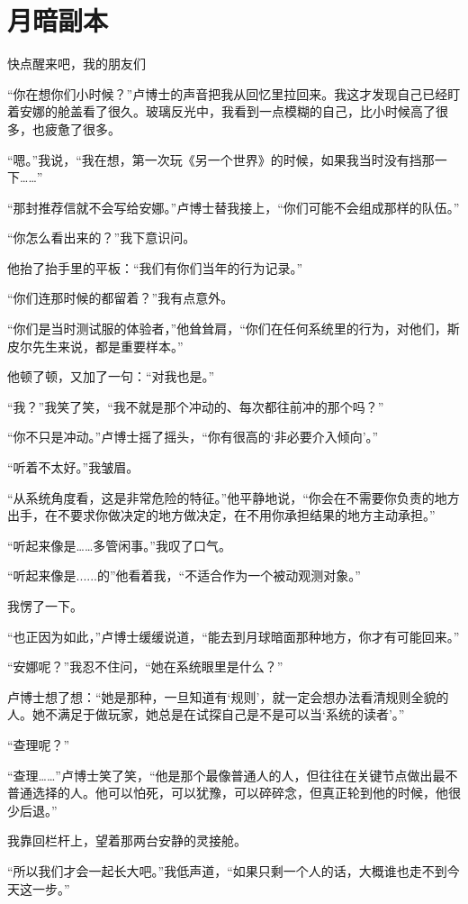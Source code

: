 \chapter{月暗副本}

快点醒来吧，我的朋友们

“你在想你们小时候？”卢博士的声音把我从回忆里拉回来。我这才发现自己已经盯着安娜的舱盖看了很久。玻璃反光中，我看到一点模糊的自己，比小时候高了很多，也疲惫了很多。

“嗯。”我说，“我在想，第一次玩《另一个世界》的时候，如果我当时没有挡那一下……”

“那封推荐信就不会写给安娜。”卢博士替我接上，“你们可能不会组成那样的队伍。”

“你怎么看出来的？”我下意识问。

他抬了抬手里的平板：“我们有你们当年的行为记录。”

“你们连那时候的都留着？”我有点意外。

“你们是当时测试服的体验者，”他耸耸肩，“你们在任何系统里的行为，对他们，斯皮尔先生来说，都是重要样本。”

他顿了顿，又加了一句：“对我也是。”

“我？”我笑了笑，“我不就是那个冲动的、每次都往前冲的那个吗？”

“你不只是冲动。”卢博士摇了摇头，“你有很高的‘非必要介入倾向’。”

“听着不太好。”我皱眉。

“从系统角度看，这是非常危险的特征。”他平静地说，“你会在不需要你负责的地方出手，在不要求你做决定的地方做决定，在不用你承担结果的地方主动承担。”

“听起来像是……多管闲事。”我叹了口气。

“听起来像是......的”他看着我，“不适合作为一个被动观测对象。”

我愣了一下。

“也正因为如此，”卢博士缓缓说道，“能去到月球暗面那种地方，你才有可能回来。”

“安娜呢？”我忍不住问，“她在系统眼里是什么？”

卢博士想了想：“她是那种，一旦知道有‘规则’，就一定会想办法看清规则全貌的人。她不满足于做玩家，她总是在试探自己是不是可以当‘系统的读者’。”

“查理呢？”

“查理……”卢博士笑了笑，“他是那个最像普通人的人，但往往在关键节点做出最不普通选择的人。他可以怕死，可以犹豫，可以碎碎念，但真正轮到他的时候，他很少后退。”

我靠回栏杆上，望着那两台安静的灵接舱。

“所以我们才会一起长大吧。”我低声道，“如果只剩一个人的话，大概谁也走不到今天这一步。”

